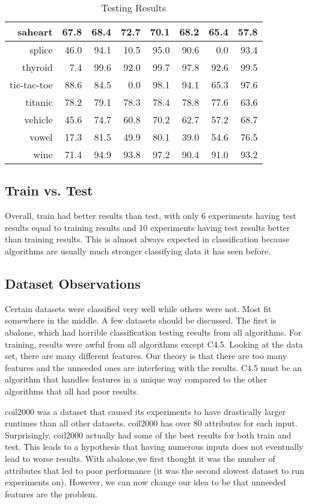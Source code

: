 \documentclass[a4paper,11pt]{article}
\begin{document}
\begin{table}[!htp]
\begin{tabular}{
|r|r|r|r|r|r|r|r|}
\hline
saheart & 67.8 & 68.4 & 72.7 & 70.1 & 68.2 & 65.4 & 57.8\\
\hline
splice & 46.0 & 94.1 & 10.5 & 95.0 & 90.6 & 0.0 & 93.4\\
\hline
thyroid & 7.4 & 99.6 & 92.0 & 99.7 & 97.8 & 92.6 & 99.5\\
\hline
tic-tac-toe & 88.6 & 84.5 & 0.0 & 98.1 & 94.1 & 65.3 & 97.6\\
\hline
titanic & 78.2 & 79.1 & 78.3 & 78.4 & 78.8 & 77.6 & 63.6\\
\hline
vehicle & 45.6 & 74.7 & 60.8 & 70.2 & 62.7 & 57.2 & 68.7\\
\hline
vowel & 17.3 & 81.5 & 49.9 & 80.1 & 39.0 & 54.6 & 76.5\\
\hline
wine & 71.4 & 94.9 & 93.8 & 97.2 & 90.4 & 91.0 & 93.2\\
\hline

\end{tabular}
\caption{Testing Results}
\end{table}

\subsection{Train vs. Test}
Overall, train had better results than test, with only 6 experiments having test results equal to training results and 10 experiments having test results better than training results. This is almost always expected in classification because algorithms are usually much stronger classifying data it has seen before. 

\subsection{Dataset Observations}
Certain datasets were classified very well while others were not. Most fit somewhere in the middle. A few datasets should be discussed. The first is abalone, which had horrible classification testing results from all algorithms. For training, results were awful from all algorithms except C4.5. Looking at the data set, there are many different features. Our theory is that there are too many features and the unneeded ones are interfering with the results. C4.5 must be an algorithm that handles features in a unique way compared to the other algorithms that all had poor results.
\par coil2000 was a dataset that caused its experiments to have drastically larger runtimes than all other datasets. coil2000 has over 80 attributes for each input. Surprisingly, coil2000 actually had some of the best results for both train and test. This leads to a hypothesis that having numerous inputs does not eventually lead to worse results. With abalone,we first thought it was the number of attributes that led to poor performance (it was the second slowest dataset to run experiments on). However, we can now change our idea to be that unneeded features are the problem. 
\end{document}
